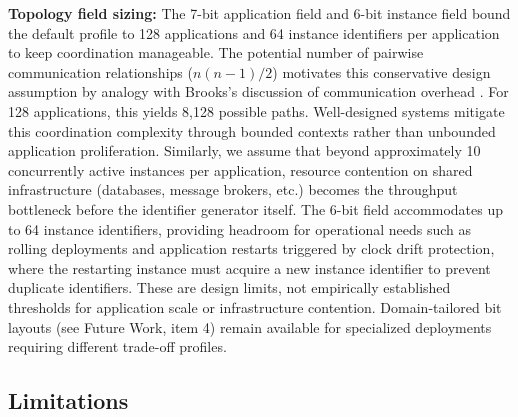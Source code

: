 \documentclass[a4paper,fleqn]{cas-sc}
\begin{document}
\textbf{Topology field sizing:} The 7-bit application field and 6-bit
instance field bound the default profile to 128 applications and 64
instance identifiers per application to keep coordination manageable.
The potential number of pairwise communication relationships
(\(n(n-1)/2\)) motivates this conservative design assumption by analogy
with Brooks's discussion of communication overhead \citep[Chapter
2]{brooks1995}. For 128 applications, this yields 8,128 possible paths.
Well-designed systems mitigate this coordination complexity through
bounded contexts \citep{evans2003} rather than unbounded application
proliferation. Similarly, we assume that beyond approximately 10
concurrently active instances per application, resource contention on
shared infrastructure (databases, message brokers, etc.) becomes the
throughput bottleneck before the identifier generator itself. The 6-bit
field accommodates up to 64 instance identifiers, providing headroom for
operational needs such as rolling deployments and application restarts
triggered by clock drift protection, where the restarting instance must
acquire a new instance identifier to prevent duplicate identifiers.
These are design limits, not empirically established thresholds for
application scale or infrastructure contention. Domain-tailored bit
layouts (see Future Work, item 4) remain available for specialized
deployments requiring different trade-off profiles.

\subsection{Limitations}\label{limitations}
\end{document}
